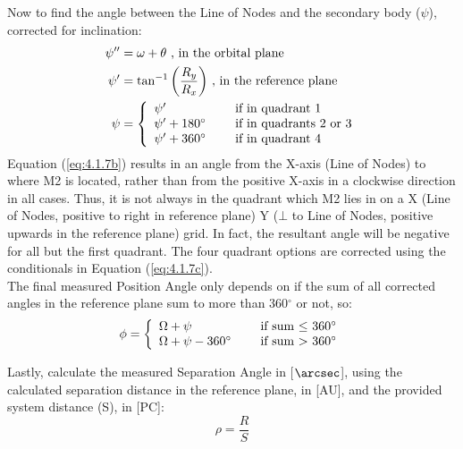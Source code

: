 \documentclass[10pt,preprint]{aastex}
\begin{document}
Now to find the angle between the Line of Nodes and the secondary body ($\psi$), corrected for inclination:
\begin{subequations}
\begin{align}
\label{eq:4.1.7a}
\psi^{\prime \prime}& = \omega + \theta \text{ , in the orbital plane}\\
\label{eq:4.1.7b}
\psi^{\prime}& = \tan^{-1} \bigg( \frac{R_y}{R_x} \bigg) \text{ , in the reference plane}\\
\label{eq:4.1.7c}
\psi& = \left\{ \begin{array}{l l l} \psi^{\prime}& \quad \text{ if in quadrant 1}\\ \psi^{\prime} + 180^{\circ}& \quad \text{ if in quadrants 2 or 3}\\ \psi^{\prime} + 360^{\circ}& \quad \text{ if in quadrant 4} \end{array}\right.
\end{align}
\end{subequations}
Equation (\ref{eq:4.1.7b}) results in an angle from the X-axis (Line of Nodes) to where M2
is located, rather than from the positive X-axis in a clockwise direction in all
cases.  Thus, it is not always in the quadrant which M2 lies in on a X (Line of Nodes, positive to right in reference plane) Y ($\bot$ to Line of Nodes, positive upwards in the reference plane) grid.  In fact, the resultant angle will be negative for all but the first quadrant.  The four quadrant options are corrected using the conditionals in Equation (\ref{eq:4.1.7c}).\\

The final measured Position Angle only depends on if the sum of all corrected angles in the reference plane sum to more than 360$^{\circ}$ or not, so:
\begin{equation}\label{eq:4.1.8}
\phi= \left\{ \begin{array}{l l} \Omega + \psi& \quad \text{ if sum $\le$ 360$^{\circ}$}\\ \Omega + \psi - 360^{\circ}& \quad \text{ if sum $>$ 360$^{\circ}$}\\ \end{array} \right.
\end{equation}

Lastly, calculate the measured Separation Angle in [$\arcsec$], using the calculated separation distance in the reference plane, in [AU], and the provided system distance (S), in [PC]:
\begin{equation}\label{eq:4.1.9}
\rho= \frac{R}{S}
\end{equation}
\end{document}
